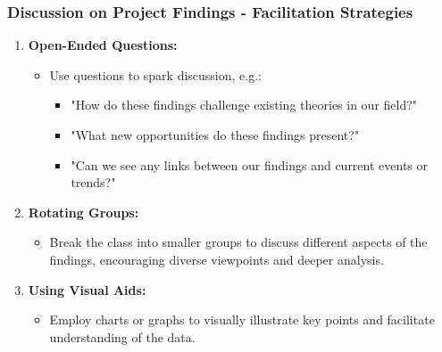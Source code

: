 \documentclass[aspectratio=169]{beamer}
\begin{document}
\begin{frame}[fragile]
    \frametitle{Discussion on Project Findings - Facilitation Strategies}
    \begin{enumerate}
        \item \textbf{Open-Ended Questions:}
            \begin{itemize}
                \item Use questions to spark discussion, e.g.:
                \begin{itemize}
                    \item "How do these findings challenge existing theories in our field?"
                    \item "What new opportunities do these findings present?"
                    \item "Can we see any links between our findings and current events or trends?"
                \end{itemize}
            \end{itemize}

        \item \textbf{Rotating Groups:}
            \begin{itemize}
                \item Break the class into smaller groups to discuss different aspects of the findings, encouraging diverse viewpoints and deeper analysis.
            \end{itemize}

        \item \textbf{Using Visual Aids:}
            \begin{itemize}
                \item Employ charts or graphs to visually illustrate key points and facilitate understanding of the data.
            \end{itemize}
    \end{enumerate}
\end{frame}
\end{document}
